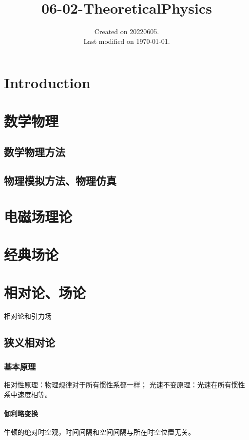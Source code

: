 \documentclass[UTF8]{../06-Physics}
\begin{document}
\title{06-02-TheoreticalPhysics}
\date{Created on 20220605.\\   Last modified on \today.}
\maketitle
\tableofcontents


\chapter{Introduction}


\chapter{数学物理}
    \section{数学物理方法}
    \section{物理模拟方法、物理仿真}






\chapter{电磁场理论}
\chapter{经典场论}




\chapter{相对论、场论}

相对论和引力场

\section{狭义相对论}

\subsection{基本原理}
相对性原理：物理规律对于所有惯性系都一样；
光速不变原理：光速在所有惯性系中速度相等。

\subsubsection{伽利略变换}
牛顿的绝对时空观，时间间隔和空间间隔与所在时空位置无关。
\end{document}
